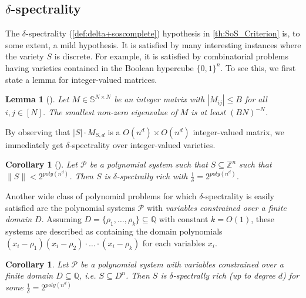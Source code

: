 \documentclass[11pt]{article}
\newcommand{\1}{\textbf{1}}
\newtheorem{lemma}[theorem]{Lemma}
\newtheorem{corollary}[theorem]{Corollary}
\begin{document}
\subsection[Delta-spectrality]{$\delta$-spectrality}\label{sect:delta_spectrality}

The $\delta$-spectrality (\cref{def:delta+soscomplete}) hypothesis in \cref{th:SoS_Criterion} is, to some extent, a mild hypothesis. It is satisfied by many interesting instances where the variety $S$ is discrete. For example, it is satisfied by combinatorial problems having varieties contained in the Boolean hypercube $\{0,1\}^n$. To see this, we first state a lemma for integer-valued matrices.

\begin{lemma}[\cite{raghavendra_weitz2017}]\label{th:spectrality_integer_matrix}
    Let $M \in \mathbb{S}^{N \times N}$ be an integer matrix with $|M_{ij}| \leq B$ for all $i,j \in [N]$. The smallest non-zero eigenvalue of $M$ is at least $(BN)^{-N}$. 
\end{lemma}

By observing that $|S| \cdot M_{S,d}$ is a $O(n^d) \times O(n^d)$ integer-valued matrix, we immediately get $\delta$-spectrality over integer-valued varieties.

\begin{corollary}[\cite{raghavendra_weitz2017}]
    Let $\mathcal{P}$ be a polynomial system such that $S \subseteq \mathbb{Z}^n$ such that $\| S \| < 2^{poly(n^d)}$. Then $S$ is $\delta$-spectrally rich with $\frac{1}{\delta} = 2^{poly(n^d)}$.
\end{corollary}

Another wide class of polynomial problems for which $\delta$-spectrality is easily satisfied are the polynomial systems $\mathcal{P}$ with \textit{variables constrained over a finite domain $D$}. Assuming $D =\{\rho_1, \dots, \rho_k\} \subseteq \mathbb{Q}$ with constant $k=O(1)$, these systems are described as containing the domain polynomials $(x_i - \rho_1)(x_i - \rho_2) \cdot \dots \cdot (x_i - \rho_k)$ for each variables $x_i$.

\begin{corollary}\label{cor:rich-finite}
    Let $\mathcal{P}$ be a polynomial system with variables constrained over a finite domain $D \subseteq \mathbb{Q}$, i.e. $S \subseteq D^n$. Then $S$ is $\delta$-spectrally rich (up to degree $d$) for some $\frac{1}{\delta} = 2^{poly(n^d)}$ 
\end{corollary}
\end{document}
